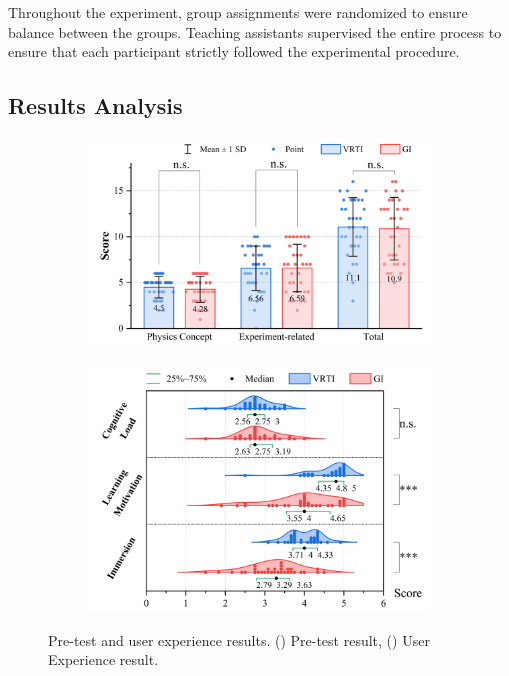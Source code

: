 \documentclass[runningheads]{llncs}
\begin{document}
Throughout the experiment, group assignments were randomized to ensure balance between the groups. Teaching assistants supervised the entire process to ensure that each participant strictly followed the experimental procedure.

\subsection{Results Analysis}
\begin{figure}[t]
  \centering
  \begin{subfigure}{0.45\textwidth} %
    \centering
    \includegraphics[width=\linewidth]{image/pre-test-result.pdf}
    \caption{} %
    \label{fig:pre-test-result}
  \end{subfigure}
  \hspace{0.05\textwidth} %
  \begin{subfigure}{0.45\textwidth} %
    \centering
    \includegraphics[width=\linewidth]{image/user-experience-result.pdf}
    \caption{} %
    \label{fig:user-experience-result}
  \end{subfigure}
  \caption{Pre-test and user experience results. () Pre-test result, () User Experience result.}
  \label{fig:pre-test-and-user-experience-result}
\end{figure}
\end{document}
